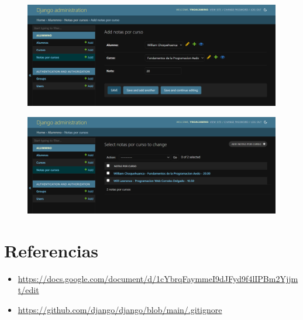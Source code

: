 \documentclass{article}
\begin{document}
	\begin{figure}[H]
		\centering
		\includegraphics[width=1.0\textwidth, keepaspectratio]{img/pagina6}
	\end{figure}
	
	\begin{figure}[H]
		\centering
		\includegraphics[width=1.0\textwidth, keepaspectratio]{img/pagina7}
	\end{figure}
	
	\clearpage
	
	\section{Referencias}
	\begin{itemize}			
		\item \url{https://docs.google.com/document/d/1cYbrqFaymmeI9dJFyd9f4lIPBm2Yjjmt/edit}
	\end{itemize}	
	
	\begin{itemize}			
		\item \url{https://github.com/django/django/blob/main/.gitignore}
	\end{itemize}	
	
	
\end{document}
